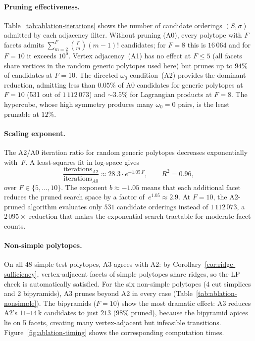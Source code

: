 \paragraph{Pruning effectiveness.}
Table~\ref{tab:ablation-iterations} shows the number of candidate orderings
$(S, \sigma)$ admitted by each adjacency filter.
Without pruning (A0), every polytope with $F$ facets admits
$\sum_{m=2}^{F} \binom{F}{m} (m-1)!$ candidates;
for $F = 8$ this is $16\,064$ and for $F = 10$ it exceeds $10^6$.
Vertex adjacency~(A1) has no effect at $F \le 5$ (all facets share vertices in
the random generic polytopes used here) but prunes up to $94\%$ of candidates
at $F = 10$.
The directed $\omega_0$ condition~(A2) provides the dominant reduction,
admitting less than $0.05\%$ of A0 candidates for generic polytopes at $F = 10$
(531 out of $1\,112\,073$) and ${\sim}3.5\%$ for Lagrangian products at $F = 8$.
The hypercube, whose high symmetry produces many $\omega_0 = 0$ pairs,
is the least prunable at $12\%$.

\paragraph{Scaling exponent.}
The A2/A0 iteration ratio for random generic polytopes
decreases exponentially with~$F$.
A least-squares fit in log-space gives
\[
  \frac{\text{iterations}_{A2}}{\text{iterations}_{A0}} \approx 28.3 \cdot e^{-1.05\, F},
  \qquad R^2 = 0.96,
\]
over $F \in \{5, \ldots, 10\}$.
The exponent $b \approx -1.05$ means that each additional facet
reduces the pruned search space by a factor of~$e^{1.05} \approx 2.9$.
At $F = 10$, the A2-pruned algorithm evaluates only $531$ candidate orderings
instead of $1\,112\,073$, a $2\,095{\times}$ reduction that makes
the exponential search tractable for moderate facet counts.

\paragraph{Non-simple polytopes.}
On all 48 simple test polytopes, A3 agrees with A2:
by Corollary~\ref{cor:ridge-sufficiency},
vertex-adjacent facets of simple polytopes share ridges,
so the LP check is automatically satisfied.
For the six non-simple polytopes (4 cut simplices and 2 bipyramids),
A3 prunes beyond A2 in every case
(Table~\ref{tab:ablation-nonsimple}).
The bipyramids ($F = 10$) show the most dramatic effect:
A3 reduces A2's $11$--$14\,\text{k}$ candidates to just $213$ ($98\%$ pruned),
because the bipyramid apices lie on 5 facets, creating many
vertex-adjacent but infeasible transitions.
Figure~\ref{fig:ablation-timing} shows the corresponding computation times.

